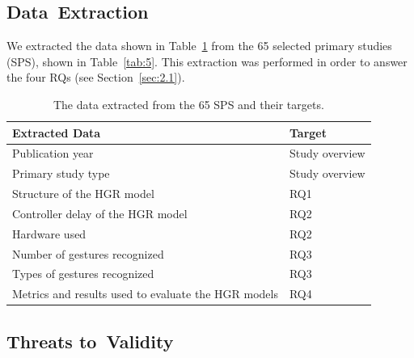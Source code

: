 \documentclass[sensors,review,accept,moreauthors,pdftex]{Definitions/mdpi}
\begin{document}
\subsection{Data~Extraction} \label{sec:2.4}
We extracted the data shown in Table~\ref{tab:6} from the 65 selected primary studies (SPS), shown in Table~\ref{tab:5}. This extraction was performed in order to answer the four RQs (see Section~\ref{sec:2.1}). 




	










\begin{table}[H]
\centering
	\caption{The data extracted from the 65 SPS and their targets.}
	\label{tab:6}
	
	\begin{tabular}{ll}
		\toprule
		\textbf{Extracted Data}&\textbf{Target}\\
		\midrule
		Publication year&Study overview\\
		
		Primary study type&Study overview\\
		
		Structure of the HGR model&RQ1\\
		
		Controller delay of the HGR model&RQ2\\
		
		Hardware used&RQ2\\
		
		Number of gestures recognized&RQ3\\
		
		Types of gestures recognized&RQ3\\
		
		Metrics and results used to evaluate the HGR models&RQ4\\
		
		\bottomrule
	\end{tabular}
\end{table}
\unskip



\subsection{Threats to~Validity}
\end{document}
